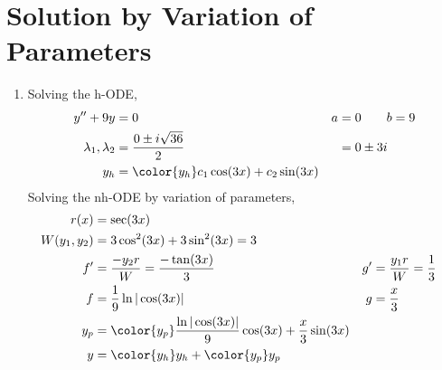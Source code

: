 \section{Solution by Variation of Parameters}

\begin{enumerate}
    \item Solving the h-ODE,
          \begin{align}
              y'' + 9y                 & = 0                                           & a & = 0 \qquad b = 9 \\
              \lambda_{1}, \lambda_{2} & = \frac{0 \pm i\sqrt{36}}{2}                  &   & = 0 \pm 3i       \\
              y_{h}                    & = {\color{y_h} c_{1}\cos(3x) + c_{2}\sin(3x)}
          \end{align}
          Solving the nh-ODE by variation of parameters,
          \begin{align}
              r(x)            & = \sec(3x)                                                                                                     \\
              W(y_{1}, y_{2}) & = 3\cos^{2}(3x) + 3\sin^{2}(3x) = 3                                                                            \\
              f'              & = \frac{-y_{2}r}{W} = \frac{-\tan(3x)}{3}                              & g' & = \frac{y_{1}r}{W} = \frac{1}{3} \\
              f               & = \frac{1}{9}\ln|\cos(3x)|                                             & g  & = \frac{x}{3}                    \\
              y_{p}           & = {\color{y_p} \frac{\ln|\cos(3x)|}{9} \cos(3x) + \frac{x}{3}\sin(3x)}                                         \\
              y               & = {\color{y_h} y_{h}} + {\color{y_p} y_{p}}
          \end{align}


\end{enumerate}
